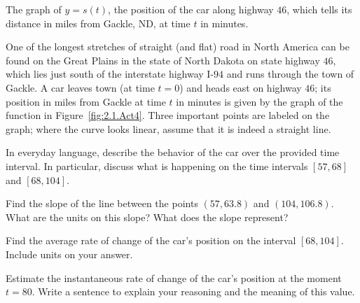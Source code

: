 \begin{marginfigure}[8cm]
\caption{The graph of $y = s(t)$, the position of the car along highway $46$, which tells its distance in miles from Gackle, ND, at time $t$ in minutes.} \label{fig:2.1.Act4}
\end{marginfigure}

\begin{activity}  \label{A:2.1.4}
One of the longest stretches of straight (and flat) road in North America can be found on the Great Plains in the state of North Dakota on state highway $46$, which lies just south of the interstate highway I-$94$ and runs through the town of Gackle.  A car leaves town (at time $t = 0$) and heads east on highway $46$; its position in miles from Gackle at time $t$ in minutes is given by the graph of the function in Figure~\ref{fig:2.1.Act4}.  Three important points are labeled on the graph; where the curve looks linear, assume that it is indeed a straight line.

\ba
	\item In everyday language, describe the behavior of the car over the provided time interval.  In particular, discuss what is happening on the time intervals $[57,68]$ and $[68,104]$.
	\item Find the slope of the line between the points $(57,63.8)$ and $(104,106.8)$.  What are the units on this slope?  What does the slope represent?
	\item Find the average rate of change of the car's position on the interval $[68,104]$.  Include units on your answer.
	\item Estimate the instantaneous rate of change of the car's position at the moment $t = 80$.  Write a sentence to explain your reasoning and the meaning of this value.
\ea
\end{activity}